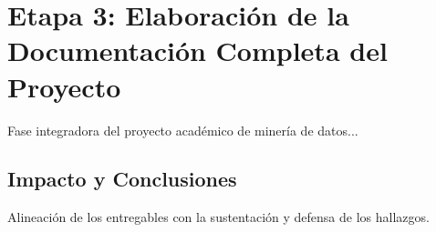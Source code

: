 \section{Etapa 3: Elaboración de la Documentación Completa del Proyecto}
\label{sec:u4_documentacion}
Fase integradora del proyecto académico de minería de datos...

\subsection{Impacto y Conclusiones}
Alineación de los entregables con la sustentación y defensa de los hallazgos.
